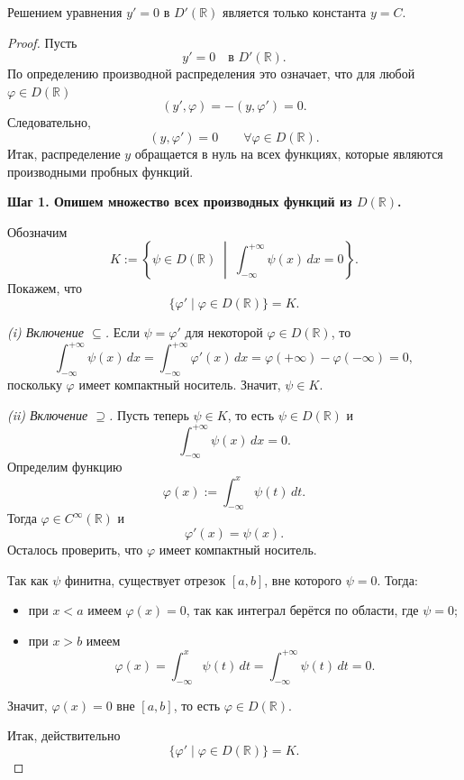 \begin{theorem}[Уравнение $y' = 0$]
	Решением уравнения $y' = 0$ в $D'(\mathbb{R})$ является только константа $y = C$.
\end{theorem}

\begin{proof}
	Пусть
	\[
	y' = 0 \quad \text{в } D'(\mathbb{R}).
	\]
	По определению производной распределения это означает, что для любой $\varphi \in D(\mathbb{R})$
	\[
	(y',\varphi) = -(y,\varphi') = 0.
	\]
	Следовательно,
	\[
	(y,\varphi') = 0 \qquad \forall \varphi \in D(\mathbb{R}).
	\]
	Итак, распределение $y$ обращается в нуль на всех функциях, которые являются производными пробных функций.
	
	\medskip
	\textbf{Шаг 1. Опишем множество всех производных функций из $D(\mathbb{R})$.}
	
	Обозначим
	\[
	K := \left\{\psi \in D(\mathbb{R}) \;\middle|\; \int_{-\infty}^{+\infty} \psi(x)\,dx = 0 \right\}.
	\]
	Покажем, что
	\[
	\{\varphi' \mid \varphi \in D(\mathbb{R})\} = K.
	\]
	
	\smallskip
	\textit{(i) Включение $\subseteq$.}
	Если $\psi = \varphi'$ для некоторой $\varphi \in D(\mathbb{R})$, то
	\[
	\int_{-\infty}^{+\infty} \psi(x)\,dx
	=
	\int_{-\infty}^{+\infty} \varphi'(x)\,dx
	=
	\varphi(+\infty)-\varphi(-\infty)=0,
	\]
	поскольку $\varphi$ имеет компактный носитель. Значит, $\psi \in K$.
	
	\smallskip
	\textit{(ii) Включение $\supseteq$.}
	Пусть теперь $\psi \in K$, то есть $\psi \in D(\mathbb{R})$ и
	\[
	\int_{-\infty}^{+\infty} \psi(x)\,dx = 0.
	\]
	Определим функцию
	\[
	\varphi(x) := \int_{-\infty}^{x} \psi(t)\,dt.
	\]
	Тогда $\varphi \in C^\infty(\mathbb{R})$ и
	\[
	\varphi'(x)=\psi(x).
	\]
	Осталось проверить, что $\varphi$ имеет компактный носитель.
	
	Так как $\psi$ финитна, существует отрезок $[a,b]$, вне которого $\psi=0$.
	Тогда:
	\begin{itemize}
		\item при $x<a$ имеем $\varphi(x)=0$, так как интеграл берётся по области, где $\psi=0$;
		\item при $x>b$ имеем
		\[
		\varphi(x)=\int_{-\infty}^{x}\psi(t)\,dt
		=
		\int_{-\infty}^{+\infty}\psi(t)\,dt
		=
		0.
		\]
	\end{itemize}
	Значит, $\varphi(x)=0$ вне $[a,b]$, то есть $\varphi \in D(\mathbb{R})$.
	
	Итак, действительно
	\[
	\{\varphi' \mid \varphi \in D(\mathbb{R})\}=K.
	\]
	

\end{proof}

